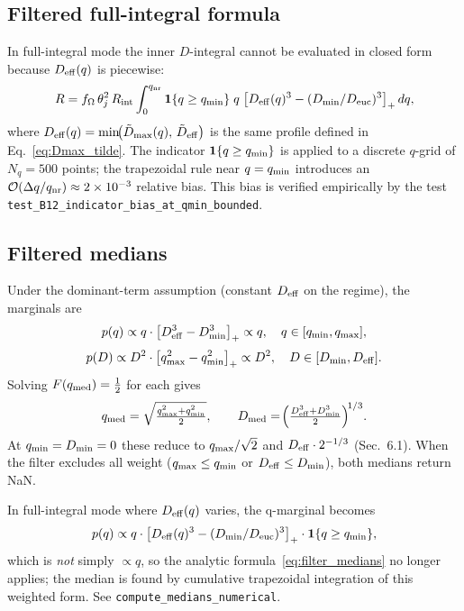 \documentclass[11pt,a4paper]{article}
\begin{document}
\subsection{Filtered full-integral formula}

In full-integral mode the inner $D$-integral cannot be evaluated in closed form because $D_{\rm eff}(q)$ is piecewise:
\begin{equation}
\label{eq:filter_full}
R = f_\Omega\,\theta_j^2\,R_{\rm int}\int_0^{q_{\rm nr}} \mathbf{1}\{q\ge q_{\rm min}\}\;q\;\bigl[D_{\rm eff}(q)^3 - (D_{\rm min}/D_{\rm euc})^3\bigr]_+\,dq,
\end{equation}
where $D_{\rm eff}(q)=\min\!\bigl(\tilde D_{\rm max}(q),\,\tilde D_{\rm eff}\bigr)$ is the same profile defined in Eq.~\eqref{eq:Dmax_tilde}.
The indicator $\mathbf{1}\{q\ge q_{\rm min}\}$ is applied to a discrete $q$-grid of $N_q=500$ points; the trapezoidal rule near $q=q_{\rm min}$ introduces an $\mathcal{O}(\Delta q/q_{\rm nr})\approx 2\times 10^{-3}$ relative bias. This bias is verified empirically by the test \texttt{test\_B12\_indicator\_bias\_at\_qmin\_bounded}.

\subsection{Filtered medians}

Under the dominant-term assumption (constant $D_{\rm eff}$ on the regime), the marginals are
\[
p(q)\propto q\cdot\bigl[D_{\rm eff}^3-D_{\rm min}^3\bigr]_+\propto q,\quad q\in[q_{\rm min},q_{\rm max}],
\]
\[
p(D)\propto D^2\cdot\bigl[q_{\rm max}^2-q_{\rm min}^2\bigr]_+\propto D^2,\quad D\in[D_{\rm min},D_{\rm eff}].
\]
Solving $F(q_{\rm med})=\tfrac{1}{2}$ for each gives
\begin{equation}
\label{eq:filter_medians}
q_{\rm med} = \sqrt{\tfrac{q_{\rm max}^2 + q_{\rm min}^2}{2}},
\qquad
D_{\rm med} = \!\left(\tfrac{D_{\rm eff}^3 + D_{\rm min}^3}{2}\right)^{\!1/3}\!.
\end{equation}
At $q_{\rm min}=D_{\rm min}=0$ these reduce to $q_{\rm max}/\sqrt{2}$ and $D_{\rm eff}\cdot 2^{-1/3}$ (Sec.~6.1). When the filter excludes all weight ($q_{\rm max}\le q_{\rm min}$ or $D_{\rm eff}\le D_{\rm min}$), both medians return NaN.

In full-integral mode where $D_{\rm eff}(q)$ varies, the q-marginal becomes
\[
p(q)\propto q\cdot\bigl[D_{\rm eff}(q)^3-(D_{\rm min}/D_{\rm euc})^3\bigr]_+\cdot \mathbf{1}\{q\ge q_{\rm min}\},
\]
which is \emph{not} simply $\propto q$, so the analytic formula~\eqref{eq:filter_medians} no longer applies; the median is found by cumulative trapezoidal integration of this weighted form. See \texttt{compute\_medians\_numerical}.
\end{document}
